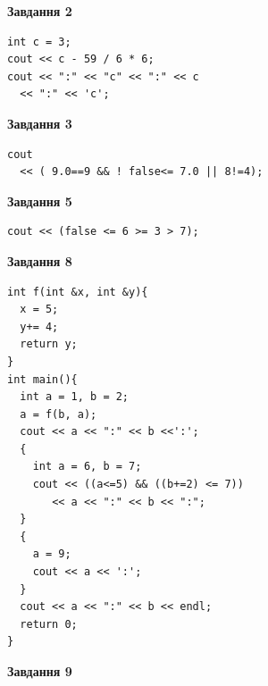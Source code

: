 \documentclass[12pt, ukrainian]{article}
\begin{document}
{\begin {large}
\begin{minipage}[t]{7.0cm}
\end{minipage}
\vline \hspace{1mm}
\begin{minipage}[t]{11.0cm}

\begin{center}
\textbf{Завдання 2}
\end{center}
\vspace{-8mm}

\begin{verbatim}
int c = 3;
cout << c - 59 / 6 * 6;
cout << ":" << "c" << ":" << c 
  << ":" << 'c';
\end{verbatim}



\begin{center}
\textbf{Завдання 3}
\end{center}
\vspace{-8mm}

\begin{verbatim}
cout 
  << ( 9.0==9 && ! false<= 7.0 || 8!=4);
\end{verbatim}



\begin{center}
\textbf{Завдання 5}
\end{center}
\vspace{-8mm}

\begin{verbatim}
cout << (false <= 6 >= 3 > 7);
\end{verbatim}



\begin{center}
\textbf{Завдання 8}
\end{center}
\vspace{-8mm}

\begin{verbatim}
int f(int &x, int &y){
  x = 5;
  y+= 4;
  return y;
}
int main(){
  int a = 1, b = 2;
  a = f(b, a);
  cout << a << ":" << b <<':';
  {
    int a = 6, b = 7;
    cout << ((a<=5) && ((b+=2) <= 7))
       << a << ":" << b << ":";
  }
  {
    a = 9;
    cout << a << ':';
  }
  cout << a << ":" << b << endl;
  return 0;
}
\end{verbatim}

\end{minipage}


\begin{minipage}[t]{7.0cm}

\begin{center}
\textbf{Завдання 9}
\end{center}
\vspace{-8mm}


\end{minipage}
\end{large}}
\end{document}
